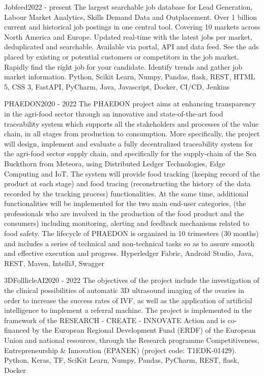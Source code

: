 
\begin{projects}
    \project
	{Jobfeed}{2022 - present}
	{}
	{The largest searchable job database for Lead Generation, Labour Market Analytics, Skills Demand Data and Outplacement. Over 1 billion current and historical job postings in one central tool. Covering 10 markets across North America and Europe. Updated real-time with the latest jobs per market, deduplicated and searchable. Available via portal, API and data feed. See the ads placed by existing or potential customers or competitors in the job market. Rapidly find the right job for your candidate. Identify trends and gather job market information.}
	{Python, Scikit Learn, Numpy, Pandas, flask, REST, HTML 5, CSS 3, FastAPI, PyCharm, Java, Javascript, Docker, CI/CD, Jenkins}
	
	\project
	{PHAEDON}{2020 - 2022}
	{}
	{The PHAEDON project aims at enhancing transparency in the agri-food sector through an innovative and state-of-the-art food traceability system which supports all the stakeholders and processes of the value chain, in all stages from production to consumption. More specifically, the project will design, implement and evaluate a fully decentralized traceability system for the agri-food sector supply chain, and specifically for the supply-chain of the Sea Buckthorn from Meteora, using Distributed Ledger Technologies, Edge Computing and IoT. The system will provide food tracking (keeping record of the product at each stage) and food tracing (reconstructing the history of the data recorded by the tracking process) functionalities. At the same time, additional functionalities will be implemented for the two main end-user categories, (the professionals who are involved in the production of the food product and the consumers) including monitoring, alerting and feedback mechanisms related to food safety. The lifecycle of PHAEDON is organized in 10 trimesters (30 months) and includes a series of technical and non-technical tasks so as to assure smooth and effective execution and progress.}
	{Hyperledger Fabric, Android Studio, Java, REST, Maven, IntelliJ, Swagger}

	\project
	{3DFolllicleAI}{2020 - 2022}
	{}
	{The objectives of the project include the investigation of the clinical possibilities of automatic 3D ultrasound imaging of the ovaries in order to increase the success rates of IVF, as well as the application of artificial intelligence to implement a referral machine. The project is implemented in the framework of the RESEARCH - CREATE - INNOVATE Action and is co-financed by the European Regional Development Fund (ERDF) of the European Union and national resources, through the Research programme Competitiveness, Entrepreneurship \& Innovation (EPANEK) (project code: T1EDK-01429).}
	{Python, Keras, TF, SciKit Learn, Numpy, Pandas, PyCharm, REST, flask, Docker}


\end{projects}
